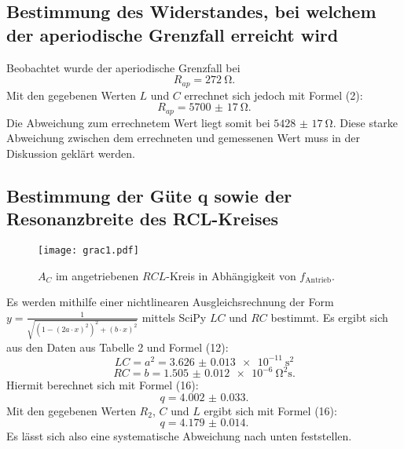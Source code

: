 \subsection{Bestimmung des Widerstandes, bei welchem der aperiodische Grenzfall erreicht wird}
Beobachtet wurde der aperiodische Grenzfall bei
\begin{displaymath}
R_{ap} = \SI{272}{\ohm}\text{.}
\end{displaymath}
Mit den gegebenen Werten $L$ und $C$ errechnet sich jedoch mit Formel (2):
\begin{displaymath}
R_{ap} = \SI{5700(17)}{\ohm}\text{.}
\end{displaymath}
Die Abweichung zum errechnetem Wert liegt somit bei $\SI{5428(17)}{\ohm}$.
Diese starke Abweichung zwischen dem errechneten und gemessenen Wert muss in der Diskussion geklärt werden.


\subsection{Bestimmung der Güte q sowie der Resonanzbreite des RCL-Kreises}
\begin{figure}[H]
	\centering
	\caption{$A_C$ im angetriebenen $RCL$-Kreis in Abhängigkeit von $f_{\text{Antrieb}}$.}
	\texttt{[image: grac1.pdf]}
	\label{fig:grac1}
\end{figure}
Es werden mithilfe einer nichtlinearen Ausgleichsrechnung der Form $y=\frac{1}{\sqrt{(1-(2a\cdot x)^2)^2+(b\cdot x)^2}} $ mittels SciPy \cite{scipy} $LC$ und $RC$ bestimmt. Es ergibt sich aus den Daten aus Tabelle 2 und Formel (12):
\begin{displaymath}
LC = a^2 = \SI{3.626(13)e-11}{\second\squared}
\end{displaymath}
\begin{displaymath}
RC = b = \SI{1.505(12)e-6}{\ohm\squared\second}\text{.}
\end{displaymath}
Hiermit berechnet sich mit Formel (16):
\begin{displaymath}
q = \num{4.002(33)}\text{.}
\end{displaymath}
Mit den gegebenen Werten $R_2$, $C$ und $L$ ergibt sich mit Formel (16):
\begin{displaymath}
q = \num{4.179(14)}\text{.}
\end{displaymath}
Es lässt sich also eine systematische Abweichung  nach unten feststellen.


